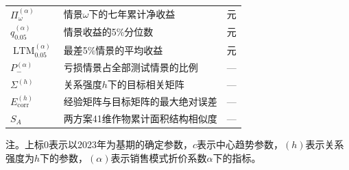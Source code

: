 \begin{longtable}{
    >{\centering\arraybackslash}p{}
    >{\centering\arraybackslash}p{}
    >{\centering\arraybackslash}p{}
  }
  $\Pi_{\omega}^{(\alpha)}$ & 情景$\omega$下的七年累计净收益 & 元 \\
  $q_{0.05}^{(\alpha)}$ & 情景收益的5\%分位数 & 元 \\
  $\operatorname{LTM}_{0.05}^{(\alpha)}$ & 最差5\%情景的平均收益 & 元 \\
  $P_-^{(\alpha)}$ & 亏损情景占全部测试情景的比例 & --- \\
  $\Sigma^{(h)}$ & 关系强度$h$下的目标相关矩阵 & --- \\
  $E_{\mathrm{corr}}^{(h)}$ & 经验矩阵与目标矩阵的最大绝对误差 & --- \\
  $S_A$ & 两方案41维作物累计面积结构相似度 & --- \\
\end{longtable}

注。上标$0$表示以2023年为基期的确定参数，$c$表示中心趋势参数，$(h)$表示关系强度为$h$下的参数，$(\alpha)$表示销售模式折价系数$\alpha$下的指标。
